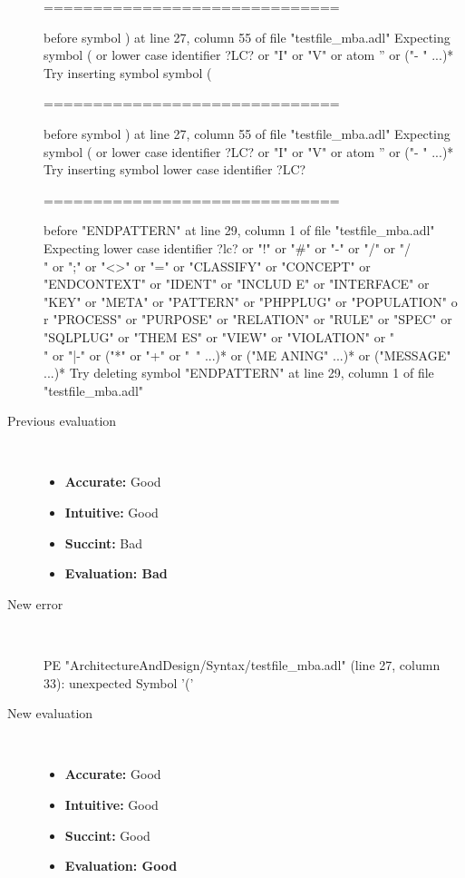 \begin{description}
\begin{haskell}
==============================

before symbol ) at line 27, column 55 of file "testfile_mba.adl"
Expecting symbol ( or lower case identifier ?LC? or "I" or "V" or atom '' or ("-
" ...)*
Try inserting symbol symbol (

==============================

before symbol ) at line 27, column 55 of file "testfile_mba.adl"
Expecting symbol ( or lower case identifier ?LC? or "I" or "V" or atom '' or ("-
" ...)*
Try inserting symbol lower case identifier ?LC?

==============================

before "ENDPATTERN" at line 29, column 1 of file "testfile_mba.adl"
Expecting lower case identifier ?lc? or "!" or "#" or "-" or "/" or "/\\" or ";"
 or "<>" or "=" or "CLASSIFY" or "CONCEPT" or "ENDCONTEXT" or "IDENT" or "INCLUD
E" or "INTERFACE" or "KEY" or "META" or "PATTERN" or "PHPPLUG" or "POPULATION" o
r "PROCESS" or "PURPOSE" or "RELATION" or "RULE" or "SPEC" or "SQLPLUG" or "THEM
ES" or "VIEW" or "VIOLATION" or "\\" or "|-" or ("*" or "+" or "~" ...)* or ("ME
ANING" ...)* or ("MESSAGE" ...)*
Try deleting symbol "ENDPATTERN" at line 29, column 1 of file "testfile_mba.adl"
\end{haskell}
  \item[Previous evaluation]~\\
    \begin{itemize}
    \item \textbf{Accurate:} Good
    \item \textbf{Intuitive:} Good
    \item \textbf{Succint:} Bad
    \item \textbf{Evaluation: Bad}
    \end{itemize}
  \item[New error]~\\
\begin{haskell}
PE "ArchitectureAndDesign/Syntax/testfile_mba.adl" (line 27, column 33):
unexpected Symbol '('\end{haskell}
  \item[New evaluation]~\\
    \begin{itemize}
    \item \textbf{Accurate:} Good
    \item \textbf{Intuitive:} Good
    \item \textbf{Succint:} Good
    \item \textbf{Evaluation: Good
}
    \end{itemize}
  \end{description}

